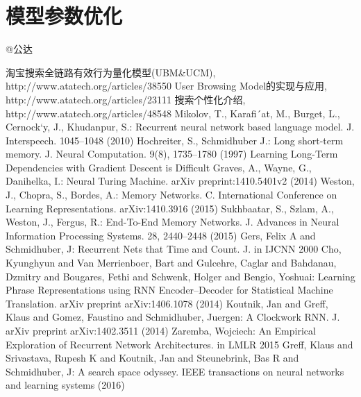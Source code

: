 \section{模型参数优化} 
	@公达

\begin{thebibliography}{99}
 淘宝搜索全链路有效行为量化模型(UBM\&UCM), http://www.atatech.org/articles/38550
 User Browsing Model的实现与应用, http://www.atatech.org/articles/23111
 搜索个性化介绍, http://www.atatech.org/articles/48548
 Mikolov, T., Karafi´at, M., Burget, L., Cernock`y, J., Khudanpur, S.: Recurrent neural network based language model. J. Interspeech. 1045–1048 (2010)
  Hochreiter, S., Schmidhuber J.: Long short-term memory. J. Neural Computation. 9(8), 1735–1780 (1997)
 Learning Long-Term Dependencies with Gradient Descent is Difficult
 Graves, A., Wayne, G., Danihelka, I.: Neural Turing Machine. arXiv preprint:1410.5401v2 (2014)
 Weston, J., Chopra, S., Bordes, A.: Memory Networks. C. International Conference on Learning Representations. arXiv:1410.3916 (2015)
 Sukhbaatar, S., Szlam, A., Weston, J., Fergus, R.: End-To-End Memory Networks. J. Advances in Neural Information Processing Systems. 28, 2440–2448 (2015)
 Gers, Felix A and Schmidhuber, J: Recurrent Nets that Time and Count. J. in IJCNN 2000
 Cho, Kyunghyun and Van Merrienboer, Bart and Gulcehre, Caglar and Bahdanau, Dzmitry and Bougares, Fethi and Schwenk, Holger and Bengio, Yoshuai: Learning Phrase Representations using RNN Encoder–Decoder for Statistical Machine Translation. arXiv preprint arXiv:1406.1078 (2014)
 Koutnik, Jan and Greff, Klaus and Gomez, Faustino and Schmidhuber, Juergen: A Clockwork RNN. J. arXiv preprint arXiv:1402.3511 (2014)
 Zaremba, Wojciech: An Empirical Exploration of Recurrent Network Architectures. in LMLR 2015
 Greff, Klaus and Srivastava, Rupesh K and Koutnik, Jan and Steunebrink, Bas R and Schmidhuber, J: A search space odyssey. IEEE transactions on neural networks and learning systems (2016)
\end{thebibliography}

 
